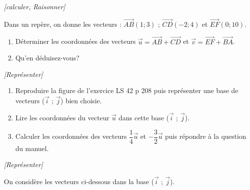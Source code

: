 \exo \textit{[calculer, Raisonner]}

Dans un repère, on donne les vecteurs :
$\overrightarrow{AB}(1;3)$ ; $\overrightarrow{CD}(-2;4)$ et $\overrightarrow{EF}(0;10)$.

\begin{enumerate}
\item Déterminer les coordonnées des vecteurs $\vec{u}=\overrightarrow{AB}+\overrightarrow{CD}$ et $\vec{v}=\overrightarrow{EF}+\overrightarrow{BA}$.
\item Qu'en déduisez-vous?
\end{enumerate}



\exo \textit{[Représenter]}

\begin{enumerate}
\item Reproduire la figure de l'exercice LS 42 p 208 puis représenter une base de vecteurs ($\vec{i}$ ; $\vec{j}$) bien choisie. 
\item Lire les coordonnées du vecteur $\vec{u}$ dans cette base ($\vec{i}$ ; $\vec{j}$).
\item Calculer les coordonnées des vecteurs  $\dfrac{1}{4}\vec{u}$ et $-\dfrac{3}{2}\vec{u}$ puis répondre à la question du manuel.

\end{enumerate}



\exo \textit{[Représenter]}

On considère les vecteurs ci-dessous dans la base ($\vec{i}$ ; $\vec{j}$).

